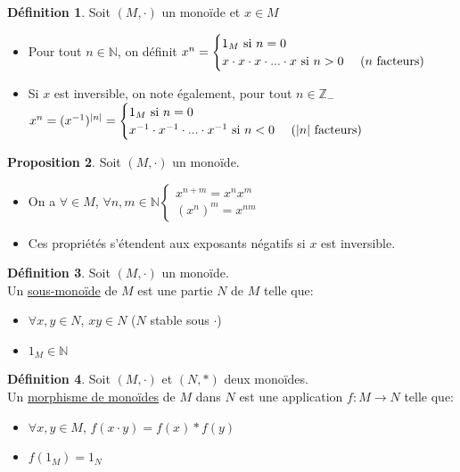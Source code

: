 \documentclass[10pt,a4paper]{article}
\theoremstyle{definition}
\newtheorem{proposition}{Proposition}[section]
\newtheorem{definition}[proposition]{Définition}
\begin{document}
\pagebreak

\begin{definition}
Soit $(M, \cdot)$ un monoïde et $x \in M$
\begin{itemize}
\item Pour tout $n \in \mathbb{N}$, on définit $x^n = \begin{cases}
1_M \text{ si } n = 0 \\
x \cdot x \cdot x \cdot ... \cdot x \text{ si } n > 0 \text{ \quad (}n\text{ facteurs) }
\end{cases}$
\item Si $x$ est inversible, on note également, pour tout $n \in \mathbb{Z}_-$ \\
$x^n =(x^{-1})^{|n|} = \begin{cases}
1_M \text{ si } n = 0 \\
x^{-1} \cdot x^{-1} \cdot ... \cdot x^{-1} \text{ si } n < 0 \text{ \quad (}|n|\text{ facteurs) }
\end{cases}$
\end{itemize}
\end{definition}
\begin{proposition}
Soit $(M, \cdot)$ un monoïde.
\begin{itemize}
\item On a $\forall \in M$, $\forall n, m \in \mathbb{N} \begin{cases}
x^{n + m} = x^n x^m \\
(x^n)^m = x^{n m }
\end{cases}$
\item Ces propriétés s'étendent aux exposants négatifs si $x$ est inversible.
\end{itemize}
\end{proposition}
\begin{definition}
Soit $(M, \cdot)$ un monoïde. \\
Un \uline{sous-monoïde} de $M$ est une partie $N$ de $M$ telle que:
\begin{itemize}
\item $\forall x, y \in N$, $x y \in N$ ($N$ stable sous $\cdot$)
\item $1_M \in \mathbb{N}$
\end{itemize}
\end{definition}
\begin{definition}
Soit $(M, \cdot)$ et $(N, *)$ deux monoïdes. \\
Un \uline{morphisme de monoïdes} de $M$ dans $N$ est une application $f: M \to N$ telle que:
\begin{itemize}
\item $\forall x, y \in M$, $f(x \cdot y) = f(x) * f(y)$
\item $f(1_M) = 1_N$
\end{itemize}
\end{definition}
\end{document}
